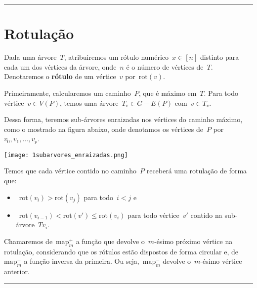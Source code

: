 \documentclass[a0,portrait]{a0poster}
\newcommand{\rot}{\mathrm{rot}}
\newcommand{\map}{\mathrm{map}}
\begin{document}
\begin{multicols}{3}
\noindent\rule[0.5ex]{\linewidth}{1pt}



\section*{Rotulação}

    Dada uma árvore~$T$, atribuiremos um 
    rótulo numérico~${x\in [n]}$ distinto para cada um dos vértices 
    da árvore, onde~$n$ é o número de vértices de~$T$. 
    Denotaremos o \textbf{rótulo} de um vértice~$v$ por~$\rot(v)$.

    Primeiramente, calcularemos 
    um caminho~$P$, que é máximo em~$T$. 
    Para todo vértice~${v\in V(P)}$, temos uma 
    árvore~${T_v \in G - E(P)}$ com~$v\in T_v$.

    Dessa forma, teremos sub-árvores enraizadas nos vértices do
    caminho máximo, como o mostrado na figura abaixo, onde denotamos
    os vértices de~$P$ por~${v_0,v_1,\ldots,v_p}$.
    
\begin{center}
\texttt{[image: 1subarvores\_enraizadas.png]}
\end{center}

    Temos que cada vértice contido no caminho~$P$ receberá 
    uma rotulação de forma que:
    \begin{itemize}
        \item~${\rot(v_i)>\rot(v_j)}$ para todo~${i<j}$ e
        \item~${\rot(v_{i-1})<\rot(v') \le \rot(v_i)}$ para todo 
        vértice~$v'$ contido na sub-árvore~$T{v_i}$. 
    \end{itemize}
    
    Chamaremos de~${\map^+_m}$ a função que devolve o~$m$-ésimo 
    próximo vértice na rotulação, considerando que os rótulos
    estão dispostos de forma circular
    e, de~${\map^-_m}$ a função inversa da primeira. 
    Ou seja,~${\map^-_m}$ devolve o~$m$-ésimo vértice anterior.

\noindent\rule[0.5ex]{\linewidth}{1pt}




\end{multicols}
\end{document}
